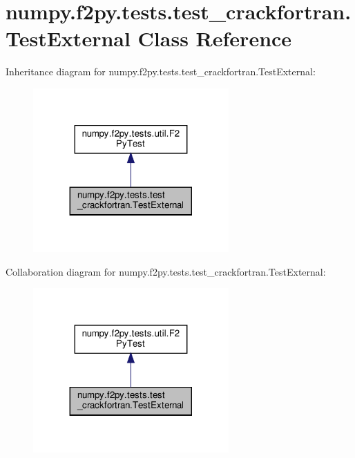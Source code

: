 \hypertarget{classnumpy_1_1f2py_1_1tests_1_1test__crackfortran_1_1TestExternal}{}\section{numpy.\+f2py.\+tests.\+test\+\_\+crackfortran.\+Test\+External Class Reference}
\label{classnumpy_1_1f2py_1_1tests_1_1test__crackfortran_1_1TestExternal}


Inheritance diagram for numpy.\+f2py.\+tests.\+test\+\_\+crackfortran.\+Test\+External\+:
\nopagebreak
\begin{figure}[H]
\begin{center}
\leavevmode
\includegraphics[width=212pt]{classnumpy_1_1f2py_1_1tests_1_1test__crackfortran_1_1TestExternal__inherit__graph}
\end{center}
\end{figure}


Collaboration diagram for numpy.\+f2py.\+tests.\+test\+\_\+crackfortran.\+Test\+External\+:
\nopagebreak
\begin{figure}[H]
\begin{center}
\leavevmode
\includegraphics[width=212pt]{classnumpy_1_1f2py_1_1tests_1_1test__crackfortran_1_1TestExternal__coll__graph}
\end{center}
\end{figure}
